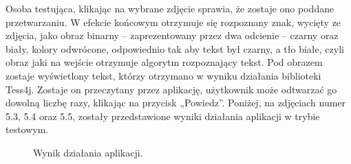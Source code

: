\documentclass[eng,oneside]{mgr}
\begin{document}
Osoba testująca, klikając na wybrane zdjęcie sprawia, że zostaje ono poddane przetwarzaniu. W efekcie końcowym otrzymuje się rozpoznany znak, wycięty ze zdjęcia, jako obraz binarny – zaprezentowany przez dwa odcienie – czarny oraz biały, kolory odwrócone, odpowiednio tak aby tekst był czarny, a tło białe, czyli obraz jaki na wejście otrzymuje algorytm rozpoznający tekst. Pod obrazem zostaje wyświetlony tekst, którzy otrzymano w wyniku działania biblioteki Tess4j. Zostaje on przeczytany przez aplikację, użytkownik może odtwarzać go dowolną liczbę razy, klikając na przycisk „Powiedz”. Poniżej, na zdjęciach numer 5.3, 5.4 oraz 5.5, zostały przedstawione wyniki działania aplikacji w trybie testowym.
\begin{figure}
\centering
{}
\quad
{}
\caption{Wynik działania aplikacji.}
\end{figure}
\end{document}
